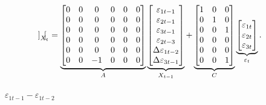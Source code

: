 \documentclass[a4paper,12pt]{article}
\begin{document}
\begin{align}
{\begin{bmatrix}
\end{bmatrix}%
}_{X_{t}}& =\underbrace{%
\begin{bmatrix}
0 & 0 & 0 & 0 & 0 & 0 \\
0 & 0 & 0 & 0 & 0 & 0 \\
0 & 0 & 0 & 0 & 0 & 0 \\
0 & 0 & 0 & 0 & 0 & 0 \\
0 & 0 & 0 & 0 & 0 & 0 \\
0 & 0 & -1 & 0 & 0 & 0%
\end{bmatrix}%
}_{A}\underbrace{%
\begin{bmatrix}
\varepsilon _{1t-1} \\
\varepsilon _{2t-1} \\
\varepsilon _{3t-1} \\
\varepsilon _{2t-3} \\
\Delta \varepsilon _{1t-2} \\
\Delta \varepsilon _{3t-1}%
\end{bmatrix}%
}_{X_{t-1}}+\underbrace{%
\begin{bmatrix}
1 & 0 & 0 \\
0 & 1 & 0 \\
0 & 0 & 1 \\
0 & 0 & 0 \\
0 & 0 & 0 \\
0 & 0 & 1%
\end{bmatrix}%
}_{C}\underbrace{%
\begin{bmatrix}
\varepsilon _{1t} \\
\varepsilon _{2t} \\
\varepsilon _{3t}%
\end{bmatrix}%
}_{\varepsilon _{t}}.
\end{align}%
\bigskip

\bigskip $\varepsilon _{1t-1}-\varepsilon _{1t-2}$
\end{document}
